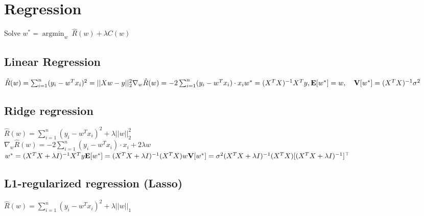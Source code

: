 \section*{Regression}

Solve $w^* ={\operatorname{argmin}_w} ~ \hat{R}(w)+ \lambda C(w)$

\subsection*{Linear Regression}

$\hat{R}(w) = \sum_{i=1}^n (y_i - w^Tx_i)^2 = ||Xw-y||^2_2\\
\nabla_w \hat{R}(w) = -2 \sum_{i=1}^n (y_i-w^T x_i) \cdot x_i \\
w^* = (X^T X)^{-1} X^T y,\\ \mathbf{E}[w^*] = w, \quad \mathbf{V}[w^*]=(X^T X)^{-1}\sigma^2$

\subsection*{Ridge regression}

$\hat{R}(w) = \sum_{i=1}^n (y_i - w^Tx_i)^2 + \lambda ||w||_2^2$\\
$\nabla_w \hat{R}(w) = -2 \sum_{i=1}^n (y_i-w^T x_i) \cdot x_i + 2 \lambda w$\\
$w^*=(X^T X + \lambda I)^{-1} X^T y \\ \mathbf{E}[w^*] = (X^T X + \lambda I)^{-1} (X^T X)w \\ \mathbf{V}[w^*]=\sigma^2 (X^T X + \lambda I)^{-1} (X^T X) [(X^T X + \lambda I)^{-1}]^{\top}$

\subsection*{L1-regularized regression (Lasso)}
$\hat{R}(w) = \sum_{i=1}^n (y_i - w^Tx_i)^2 + \lambda ||w||_1$